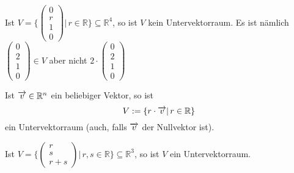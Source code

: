 \begin{beispiel}
Ist $V = \{ \left( \begin{smallmatrix} 0 \\ r \\ 1 \\ 0 \end{smallmatrix} \right) \vert \, 
r \in \mathbb R\} \subseteq \mathbb R^4$, so ist $V$ kein Untervektorraum. Es ist 
nämlich $\left( \begin{smallmatrix} 0 \\ 2 \\ 1 \\ 0 \end{smallmatrix} \right) \in V$ aber nicht 
$2 \cdot \left( \begin{smallmatrix} 0 \\ 2 \\ 1 \\ 0 \end{smallmatrix} \right)$ 
\end{beispiel}



\begin{beispiel}\label{uvr_gen_gerade} Ist $\overrightarrow{v} \in \mathbb R^n$ ein beliebiger Vektor, so ist 
  	$$ V := \{ r \cdot \overrightarrow{v} \vert \, r \in \mathbb R \} $$
ein Untervektorraum (auch, falls $\overrightarrow{v}$ der Nullvektor ist).
\end{beispiel}

\begin{beispiel}
Ist $V = \{ \left( \begin{smallmatrix} r \\ s \\ r+s \end{smallmatrix} \right) \vert \, 
r,s \in \mathbb R\} \subseteq \mathbb R^3$, so ist $V$ ein Untervektorraum.
\end{beispiel}

%

\medbreak

